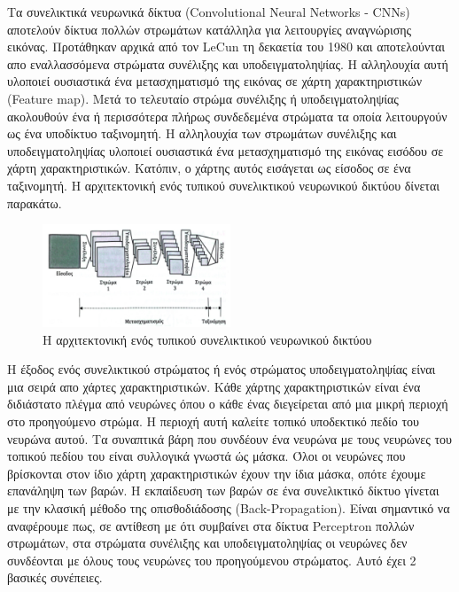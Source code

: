 \documentclass[12pt]{article}
\numberwithin{equation}{section}
\begin{document}
Τα συνελικτικά νευρωνικά δίκτυα (Convolutional Neural Networks - CNNs) αποτελούν δίκτυα πολλών στρωμάτων κατάλληλα για λειτουργίες αναγνώρισης εικόνας. Προτάθηκαν αρχικά από τον LeCun τη δεκαετία του 1980 και αποτελούνται απο εναλλασσόμενα στρώματα συνέλιξης και υποδειγματοληψίας. Η αλληλουχία αυτή υλοποιεί ουσιαστικά ένα μετασχηματισμό της εικόνας σε χάρτη χαρακτηριστικών (Feature map). Μετά το τελευταίο στρώμα συνέλιξης ή υποδειγματοληψίας ακολουθούν ένα ή περισσότερα πλήρως συνδεδεμένα στρώματα τα οποία λειτουργούν ως ένα υποδίκτυο ταξινομητή. Η αλληλουχία των στρωμάτων συνέλιξης και υποδειγματοληψίας υλοποιεί ουσιαστικά ένα μετασχηματισμό της εικόνας εισόδου σε χάρτη χαρακτηριστικών. Κατόπιν, ο χάρτης αυτός εισάγεται ως είσοδος σε ένα ταξινομητή. Η αρχιτεκτονική ενός τυπικού συνελικτικού νευρωνικού δικτύου δίνεται παρακάτω. \\

\begin{figure}[h!]
  \centering
  \includegraphics[width=0.5\textwidth]{images/CNN_arch.png} %
  \caption{Η αρχιτεκτονική ενός τυπικού συνελικτικού νευρωνικού δικτύου}
  \label{figure 18}
\end{figure} 

Η έξοδος ενός συνελικτικού στρώματος ή ενός στρώματος υποδειγματοληψίας είναι μια σειρά απο χάρτες χαρακτηριστικών. Κάθε χάρτης χαρακτηριστικών είναι ένα διδιάστατο πλέγμα από νευρώνες όπου ο κάθε ένας διεγείρεται από μια μικρή περιοχή στο προηγούμενο στρώμα. Η περιοχή αυτή καλείτε τοπικό υποδεκτικό πεδίο του νευρώνα αυτού. Τα συναπτικά βάρη που συνδέουν ένα νευρώνα με τους νευρώνες του τοπικού πεδίου του είναι συλλογικά γνωστά ώς μάσκα. Όλοι οι νευρώνες που βρίσκονται στον ίδιο χάρτη χαρακτηριστικών έχουν την ίδια μάσκα, οπότε έχουμε επανάληψη των βαρών. Η εκπαίδευση των βαρών σε ένα συνελικτικό δίκτυο γίνεται με την κλασική μέθοδο της οπισθοδιάδοσης (Back-Propagation). Είναι σημαντικό να αναφέρουμε πως, σε αντίθεση με ότι συμβαίνει στα δίκτυα Perceptron πολλών στρωμάτων, στα στρώματα συνέλιξης και υποδειγματοληψίας οι νευρώνες δεν συνδέονται με όλους τους νευρώνες του προηγούμενου στρώματος. Αυτό έχει 2 βασικές συνέπειες.\\
\end{document}
